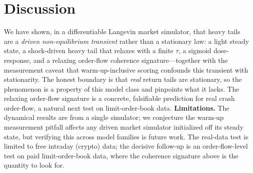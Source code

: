\documentclass{article}
\begin{document}
\section{Discussion}
We have shown, in a differentiable Langevin market simulator, that heavy tails are a \emph{driven
non-equilibrium transient} rather than a stationary law: a light steady state, a shock-driven heavy
tail that relaxes with a finite $\tau$, a sigmoid dose-response, and a relaxing order-flow coherence
signature---together with the measurement caveat that warm-up-inclusive scoring confounds this
transient with stationarity. The honest boundary is that \emph{real} return tails are stationary, so
the phenomenon is a property of this model class and pinpoints what it lacks. The relaxing order-flow
signature is a concrete, falsifiable prediction for real crash order-flow, a natural next test on
limit-order-book data. \textbf{Limitations.} The dynamical results are from a single simulator; we
conjecture the warm-up measurement pitfall affects any driven market simulator initialized off its
steady state, but verifying this across model families is future work. The real-data test is limited
to free intraday (crypto) data; the decisive follow-up is an order-flow-level test on paid
limit-order-book data, where the coherence signature above is the quantity to look for.

{\small


}
\end{document}
